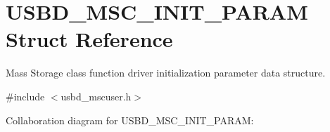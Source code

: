 \hypertarget{structUSBD__MSC__INIT__PARAM}{}\section{U\+S\+B\+D\+\_\+\+M\+S\+C\+\_\+\+I\+N\+I\+T\+\_\+\+P\+A\+R\+AM Struct Reference}
\label{structUSBD__MSC__INIT__PARAM}


Mass Storage class function driver initialization parameter data structure.  




{\ttfamily \#include $<$usbd\+\_\+mscuser.\+h$>$}



Collaboration diagram for U\+S\+B\+D\+\_\+\+M\+S\+C\+\_\+\+I\+N\+I\+T\+\_\+\+P\+A\+R\+AM\+:
